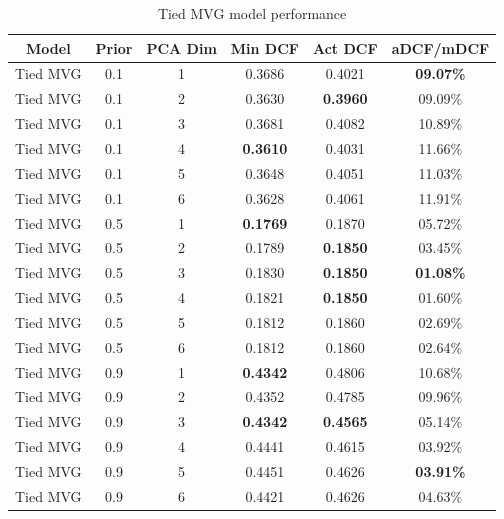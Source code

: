 \documentclass[12pt, a4paper]{article}
\begin{document}
\begin{table}[ht!]
	\centering
	\begin{tabular}{| | c c c c c c | |}
		\hline
		Model & Prior & PCA Dim & Min DCF & Act DCF & aDCF/mDCF \\
		\hline\hline
		Tied MVG & 0.1 & 1 & 0.3686 & 0.4021 & \textbf{09.07\%} \\
		\hline
		Tied MVG & 0.1 & 2 & 0.3630 & \textbf{0.3960} & 09.09\% \\
		\hline
		Tied MVG & 0.1 & 3 & 0.3681 & 0.4082 & 10.89\% \\
		\hline
		Tied MVG & 0.1 & 4 & \textbf{0.3610} & 0.4031 & 11.66\% \\
		\hline
		Tied MVG & 0.1 & 5 & 0.3648 & 0.4051 & 11.03\% \\
		\hline
		Tied MVG & 0.1 & 6 & 0.3628 & 0.4061 & 11.91\% \\
		\hline\hline
		Tied MVG & 0.5 & 1 & \textbf{0.1769} & 0.1870 & 05.72\% \\
		\hline
		Tied MVG & 0.5 & 2 & 0.1789 & \textbf{0.1850} & 03.45\% \\
		\hline
		Tied MVG & 0.5 & 3 & 0.1830 & \textbf{0.1850} & \textbf{01.08\%} \\
		\hline
		Tied MVG & 0.5 & 4 & 0.1821 & \textbf{0.1850} & 01.60\% \\
		\hline
		Tied MVG & 0.5 & 5 & 0.1812 & 0.1860 & 02.69\% \\
		\hline
		Tied MVG & 0.5 & 6 & 0.1812 & 0.1860 & 02.64\% \\
		\hline\hline
		Tied MVG & 0.9 & 1 & \textbf{0.4342} & 0.4806 & 10.68\% \\
		\hline
		Tied MVG & 0.9 & 2 & 0.4352 & 0.4785 & 09.96\% \\
		\hline
		Tied MVG & 0.9 & 3 & \textbf{0.4342} & \textbf{0.4565} & 05.14\% \\
		\hline
		Tied MVG & 0.9 & 4 & 0.4441 & 0.4615 & 03.92\% \\
		\hline
		Tied MVG & 0.9 & 5 & 0.4451 & 0.4626 & \textbf{03.91\%} \\
		\hline
		Tied MVG & 0.9 & 6 & 0.4421 & 0.4626 & 04.63\% \\
		\hline
	\end{tabular}
	\caption{Tied MVG model performance}
\end{table}
\end{document}
